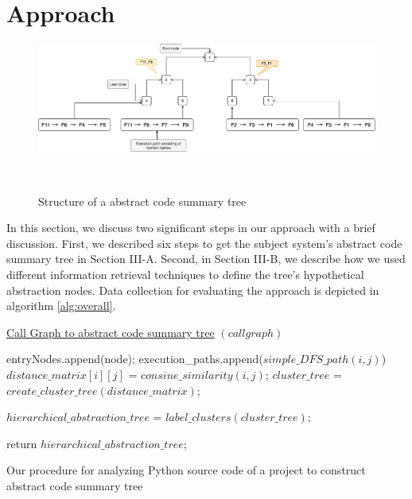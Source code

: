 \section{Approach}
\label{hla2:approach}
\begin{figure}[tb]
  \centering
  \includegraphics[width=\columnwidth]{figures/hla2/tree_structure.png}
  \caption{Structure of a abstract code summary tree}~\label{fig:tree_structure}
\end{figure}
In this section, we discuss two significant steps in our approach with a brief discussion. First, we described six steps to get the subject system's abstract code summary tree in Section III-A. Second, in Section III-B, we describe how we used different information retrieval techniques to define the tree's hypothetical abstraction nodes. Data collection for evaluating the approach is depicted in algorithm \ref{alg:overall}.


\begin{algorithm}
    
    \underline{Call Graph to abstract code summary tree} $(call graph)$\;
    
    {
        {
            entryNodes.append(node);
        }
    } 
    {
        {
            execution\_paths.append($simple\_DFS\_path(i, j)$)
        }
    }
    {
        {
            $distance\_matrix[i][j]$ = $consine\_similarity(i,j)$;
        }
    }
    $cluster\_tree$ = $create\_cluster\_tree(distance\_matrix)$;
    
    $hierarchical\_abstraction\_tree$ = $label\_clusters(cluster\_tree)$;
    
    return $hierarchical\_abstraction\_tree$;
    \caption{Our procedure for analyzing Python source code of a project to construct abstract code summary tree}
    \label{alg:overall}
\end{algorithm}

